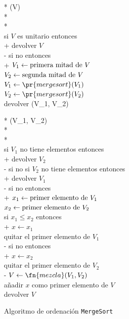 \documentclass[conference,a4paper]{IEEEtran}
\begin{document}
\begin{figure}
  \begin{pseudo}*
    (V) \\*
     \\*
     \\
    si \( V \) \textnormal{es unitario} entonces \\+
    devolver \( V \) \\-
    si no entonces \\+
    \( V_{1} \leftarrow \textnormal{primera mitad de } V\) \\
    \( V_{2} \leftarrow \textnormal{segunda mitad de } V\) \\
    \( V_{1} \leftarrow \pr{mergesort}(V_{1}) \) \\
    \( V_{2} \leftarrow \pr{mergesort}(V_{2}) \) \\
    devolver (V_{1}, V_{2})
  \end{pseudo}
  
  \begin{pseudo}*
    (V_{1}, V_{2}) \\*
     \\*
     \\
    si \( V_{1} \) \textnormal{no tiene elementos} entonces \\+
    devolver \( V_{2} \) \\-
    si no si \( V_{2} \) \textnormal{no tiene elementos} entonces \\+
    devolver \( V_{1} \) \\-
    si no entonces \\+
    \( x_{1} \leftarrow \textnormal{primer elemento de } V_{1} \) \\
    \( x_{2} \leftarrow \textnormal{primer elemento de } V_{2} \) \\
    si \( x_{1} \leq x_{2} \) entonces \\+
    \( x \leftarrow x_{1} \) \\
    \textnormal{quitar el primer elemento de} \( V_{1} \) \\-
    si no entonces \\+
    \( x \leftarrow x_{2} \) \\
    \textnormal{quitar el primer elemento de} \( V_{2} \) \\-
    \( V \leftarrow \fn{mezcla}(V_{1}, V_{2}) \) \\
    \textnormal{añadir} \( x \)
    \textnormal{como primer elemento de} \( V \) \\
    devolver \( V \)
  \end{pseudo}
  \caption{Algoritmo de ordenación \texttt{MergeSort}}
  \label{pcd:mergesort}
\end{figure}
\end{document}
